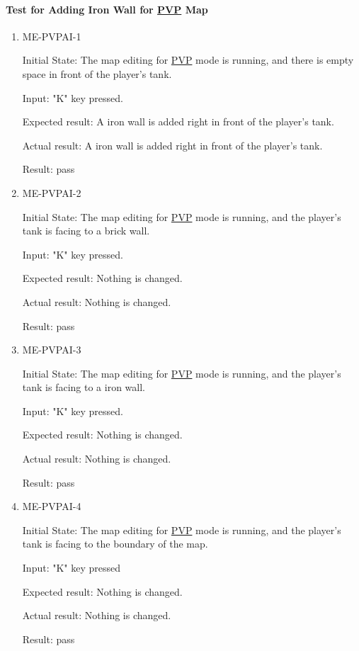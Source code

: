 \documentclass[12pt, titlepage]{article}
\begin{document}
\paragraph{Test for Adding Iron Wall for \underline{PVP} Map}

\begin{enumerate}

\item{ME-PVPAI-1\\}
					
Initial State: The map editing for \underline{PVP} mode is running, and there is empty space in front of the player's tank.
					
Input: "K" key pressed.
					
Expected result: A iron wall is added right in front of the player's tank.
					
Actual result: A iron wall is added right in front of the player's tank.

Result: pass

\item{ME-PVPAI-2\\}
					
Initial State: The map editing for \underline{PVP} mode is running, and the player's tank is facing to a brick wall.
					
Input: "K" key pressed.
					
Expected result: Nothing is changed.
					
Actual result: Nothing is changed.

Result: pass

\item{ME-PVPAI-3\\}
					
Initial State: The map editing for \underline{PVP} mode is running, and the player's tank is facing to a iron wall.
					
Input: "K" key pressed.
					
Expected result: Nothing is changed.
					
Actual result: Nothing is changed.

Result: pass

\item{ME-PVPAI-4\\}
					
Initial State: The map editing for \underline{PVP} mode is running, and the player's tank is facing to the boundary of the map.
					
Input: "K" key pressed
					
Expected result: Nothing is changed.
					
Actual result: Nothing is changed.

Result: pass

\end{enumerate}
\end{document}
